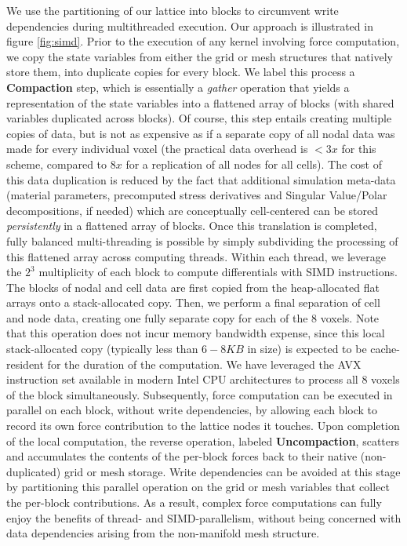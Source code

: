 We use the partitioning of our lattice into blocks to circumvent write
dependencies during multithreaded execution. Our approach is
illustrated in figure \ref{fig:simd}. Prior to the execution of any
kernel involving force computation, we copy the state variables from
either the grid or mesh structures that natively store them, into
duplicate copies for every block. We label this process a
\textbf{Compaction} step, which is essentially a \emph{gather}
operation that yields a representation of the state variables into a
flattened array of blocks (with shared variables duplicated across
blocks). Of course, this step entails creating multiple copies of
data, but is not as expensive as if a separate copy of all nodal data
was made for every individual voxel (the practical data overhead is
$<3x$ for this scheme, compared to $8x$ for a replication of all nodes
for all cells). The cost of this data duplication is reduced by the
fact that additional simulation meta-data (material parameters,
precomputed stress derivatives and Singular Value/Polar
decompositions, if needed) which are conceptually cell-centered can be
stored \emph{persistently} in a flattened array of blocks. Once this
translation is completed, fully balanced multi-threading is possible
by simply subdividing the processing of this flattened array across
computing threads. Within each thread, we leverage the $2^3$
multiplicity of each block to compute differentials with SIMD
instructions. The blocks of nodal and cell data are first copied from
the heap-allocated flat arrays onto a stack-allocated copy. Then, we
perform a final separation of cell and node data, creating one fully
separate copy for each of the 8 voxels. Note that this operation does
not incur memory bandwidth expense, since this local stack-allocated
copy (typically less than $6-8KB$ in size) is expected to be
cache-resident for the duration of the computation. We have leveraged
the AVX instruction set available in modern Intel CPU architectures to
process all 8 voxels of the block simultaneously. Subsequently, force
computation can be executed in parallel on each block, without write
dependencies, by allowing each block to record its own force
contribution to the lattice nodes it touches. Upon completion of the
local computation, the reverse operation, labeled
\textbf{Uncompaction}, scatters and accumulates the contents of the
per-block forces back to their native (non-duplicated) grid or mesh
storage. Write dependencies can be avoided at this stage by
partitioning this parallel operation on the grid or mesh variables
that collect the per-block contributions. As a result, complex force
computations can fully enjoy the benefits of thread- and
SIMD-parallelism, without being concerned with data dependencies
arising from the non-manifold mesh structure.

